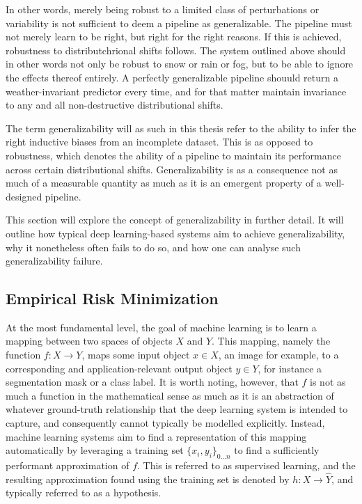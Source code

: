 	In other words, merely being robust to a limited class of perturbations or variability is not sufficient to deem a pipeline as generalizable. The pipeline must not merely learn to be right, but right for the right reasons. If this is achieved, robustness to distributchrional shifts follows. The system outlined above should in other words not only be robust to snow or rain or fog, but to be able to ignore the effects thereof entirely. A perfectly generalizable pipeline shouuld return a weather-invariant predictor every time, and for that matter maintain invariance to any and all non-destructive distributional shifts. 
	        
	The term generalizability will as such in this thesis refer to the ability to infer the right inductive biases from an incomplete dataset. This is as opposed to robustness, which denotes the ability of a pipeline to maintain its performance across certain distributional shifts. Generalizability is as a consequence not as much of a measurable quantity as much as it is an emergent property of a well-designed pipeline. 
	        
	This section will explore the concept of generalizability in further detail. It will outline how typical deep learning-based systems aim to achieve generalizability, why it nonetheless often fails to do so, and how one can analyse such generalizability failure.
\subsection{Empirical Risk Minimization}
	At the most fundamental level, the goal of machine learning is to learn a mapping between two spaces of objects \(X\) and \(Y\). This mapping, namely the function \(f: X \rightarrow Y\), maps some input object \(x \in X\), an image for example, to a corresponding and application-relevant output object \(y \in Y\), for instance a segmentation mask or a class label. It is worth noting, however, that \(f\) is not as much a function in the mathematical sense as much as it is an abstraction of whatever ground-truth relationship that the deep learning system is intended to capture, and consequently cannot typically be modelled explicitly. Instead, machine learning systems aim to find a representation of this mapping automatically by leveraging a training set \(\{x_i, y_i\}_{0...n}\) to find a sufficiently performant approximation of \(f\). This is referred to as supervised learning, and the resulting approximation found using the training set is denoted by \(h: X \rightarrow \hat{Y}\), and typically referred to as a hypothesis.  
	        
